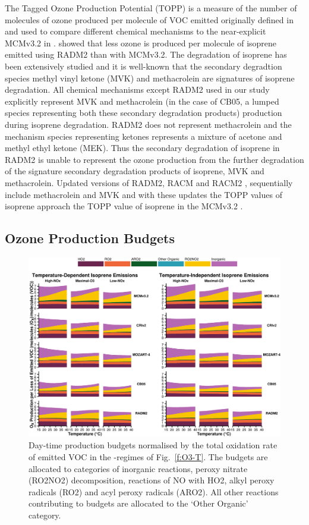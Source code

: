 The Tagged Ozone Production Potential (TOPP) is a measure of the number of molecules of ozone produced per molecule of VOC emitted originally defined in \citet{Butler:2011} and used to compare different chemical mechanisms to the near-explicit {MCMv3.2} in \citet{Coates:2015}.
\citet{Coates:2015} showed that less ozone is produced per molecule of isoprene emitted using RADM2 than with MCMv3.2.
The degradation of isoprene has been extensively studied and it is well-known that the secondary degradtion species methyl vinyl ketone (MVK) and methacrolein are signatures of isoprene degradation.
All chemical mechanisms except RADM2 used in our study explicitly represent MVK and methacrolein (in the case of CB05, a lumped species representing both these secondary degradation products) production during isoprene degradation.
RADM2 does not represent methacrolein and the mechanism species representing ketones represents a mixture of acetone and methyl ethyl ketone (MEK). 
Thus the secondary degradation of isoprene in RADM2 is unable to represent the ozone production from the further degradation of the signature secondary degradation products of isoprene, MVK and methacrolein.
Updated versions of RADM2, RACM \citep{Stockwell:1997} and RACM2 \citep{Goliff:2013}, sequentially include methacrolein and MVK and with these updates the TOPP values of isoprene approach the TOPP value of isoprene in the MCMv3.2 \citep{Coates:2015}.

\subsection{Ozone Production Budgets} \label{ss:r_budgets}

\begin{figure}[t]%
    \centering%
    \caption{Day-time  production budgets normalised by the total oxidation rate of emitted VOC in the -regimes of Fig.~\ref{f:O3-T}. The budgets are allocated to categories of inorganic reactions, peroxy nitrate (RO2NO2) decomposition, reactions of NO with HO2, alkyl peroxy radicals (RO2) and acyl peroxy radicals (ARO2). All other reactions contributing to  budgets are allocated to the `Other Organic' category.}%
    \label{f:ozone_budgets}%
    \includegraphics[width=\textwidth]{img/Ox_budgets}
\end{figure}

